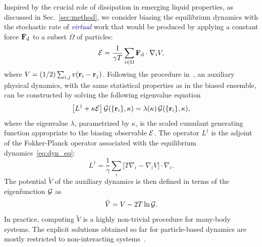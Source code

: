 \documentclass[pre, superscriptaddress, twocolumn,pre]{revtex4-1}
\begin{document}
Inspired by the crucial role of dissipation in emerging liquid properties, as discussed in Sec.~\ref{sec:method}, we consider biasing the equilibrium dynamics with the stochastic  rate of \textcolor{blue}{\it virtual} work that would be produced by applying a constant force ${\bf F}_{\rm d}$ to a subset $\Omega$ of particles:
\begin{equation}\label{eq:eps}
	{\cal E} = \frac{1}{\gamma T}\sum_{i\in\Omega} {\bf F}_{\rm d}\cdot\nabla_i V ,
\end{equation}
where $V=(1/2)\sum_{i,j}v({\bf r}_i-{\bf r}_j)$. Following the procedure in~\cite{Jack2010,Chetrite2013}, an auxiliary physical dynamics, with the same statistical properties as in the biased ensemble, can be constructed by solving the following eigenvalue equation 
\begin{equation}\label{eq:adjointbiased}
	\big[L^\dagger + \kappa{\cal E}\big]\,{\cal G}(\{{\bf r}_i\},\kappa) = \lambda(\kappa)\,{\cal G}(\{{\bf r}_i\},\kappa) ,
\end{equation}
where the eigenvalue $\lambda$, parametrized by $\kappa$, is the scaled cumulant generating function appropriate to the biasing observable $\cal E$. The operator $L^\dagger$ is the adjoint of the Fokker-Planck operator associated with the equilibrium dynamics~\eqref{eq:dyn_eq}:
\begin{equation}\label{eq:L}
	L^\dagger = \frac{1}{\gamma} \sum_i\big[ T \nabla_i - \nabla_i V\big] \cdot\nabla_i .
\end{equation}
The potential $\tilde V$ of the auxiliary dynamics is then defined in terms of the eigenfunction ${\cal G}$ as 
\begin{equation}
	\tilde V = V - 2 T \ln{\cal G} .
\end{equation}
In practice, computing $\tilde V$ is a highly non-trivial procedure for many-body systems. The explicit solutions obtained so far for particle-based dynamics are mostly restricted to non-interacting systems~\cite{Chetrite2013, Touchette2016}.
\end{document}
